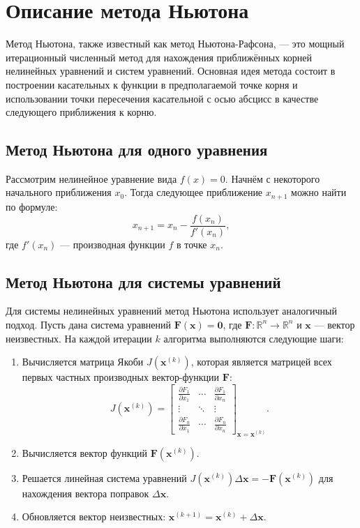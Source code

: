 \section{Описание метода Ньютона}

Метод Ньютона, также известный как метод Ньютона-Рафсона, — это мощный итерационный численный метод для нахождения приближённых корней нелинейных уравнений и систем уравнений. Основная идея метода состоит в построении касательных к функции в предполагаемой точке корня и использовании точки пересечения касательной с осью абсцисс в качестве следующего приближения к корню.

\subsection{Метод Ньютона для одного уравнения}

Рассмотрим нелинейное уравнение вида \( f(x) = 0 \). Начнём с некоторого начального приближения \( x_0 \). Тогда следующее приближение \( x_{n+1} \) можно найти по формуле:
\[
	x_{n+1} = x_n - \frac{f(x_n)}{f'(x_n)},
\]
где \( f'(x_n) \) — производная функции \( f \) в точке \( x_n \).

\subsection{Метод Ньютона для системы уравнений}

Для системы нелинейных уравнений метод Ньютона использует аналогичный подход. Пусть дана система уравнений \( \mathbf{F}(\mathbf{x}) = \mathbf{0} \), где \( \mathbf{F}: \mathbb{R}^n \to \mathbb{R}^n \) и \( \mathbf{x} \) — вектор неизвестных. На каждой итерации \( k \) алгоритма выполняются следующие шаги:

\begin{enumerate}
	\item Вычисляется матрица Якоби \( J(\mathbf{x}^{(k)}) \), которая является матрицей всех первых частных производных вектор-функции \( \mathbf{F} \):
	      \[
		      J(\mathbf{x}^{(k)}) = \begin{bmatrix}
			      \frac{\partial F_1}{\partial x_1} & \cdots & \frac{\partial F_1}{\partial x_n} \\
			      \vdots                            & \ddots & \vdots                            \\
			      \frac{\partial F_n}{\partial x_1} & \cdots & \frac{\partial F_n}{\partial x_n}
		      \end{bmatrix}_{\mathbf{x} = \mathbf{x}^{(k)}}.
	      \]

	\item Вычисляется вектор функций \( \mathbf{F}(\mathbf{x}^{(k)}) \).

	\item Решается линейная система уравнений \( J(\mathbf{x}^{(k)}) \Delta \mathbf{x} = -\mathbf{F}(\mathbf{x}^{(k)}) \) для нахождения вектора поправок \( \Delta \mathbf{x} \).

	\item Обновляется вектор неизвестных: \( \mathbf{x}^{(k+1)} = \mathbf{x}^{(k)} + \Delta \mathbf{x} \).
\end{enumerate}

